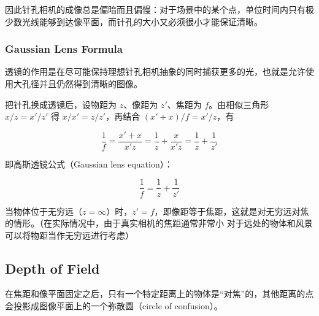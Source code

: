 因此针孔相机的成像总是偏暗而且偏慢：对于场景中的某个点，单位时间内只有极少数光线能够到达像平面，而针孔的大小又必须很小才能保证清晰。

\subsubsection{Gaussian Lens Formula}

透镜的作用是在尽可能保持理想针孔相机抽象的同时捕获更多的光，也就是允许使用大孔径并且仍然得到清晰的图像。

把针孔换成透镜后，设物距为 $z$、像距为 $z'$、焦距为 $f$。由相似三角形 $x/z = x'/z'$ 得 $x/x' = z/z'$，再结合 $(x'+x)/f = x'/z$，有

\[
\frac{1}{f} = \frac{x'+x}{x'z} = \frac{1}{z} + \frac{x}{x'z} = \frac{1}{z} + \frac{1}{z'}
\]

即高斯透镜公式（Gaussian lens equation）：

\[
\frac{1}{f} = \frac{1}{z} + \frac{1}{z'}
\]

当物体位于无穷远（$z = \infty$）时，$z' = f$，即像距等于焦距，这就是对无穷远对焦的情形。（在实际情况中，由于真实相机的焦距通常非常小
对于远处的物体和风景可以将物距当作无穷远进行考虑）

\subsection{Depth of Field}

在焦距和像平面固定之后，只有一个特定距离上的物体是“对焦”的，其他距离的点会投影成图像平面上的一个弥散圆（circle of confusion）。

